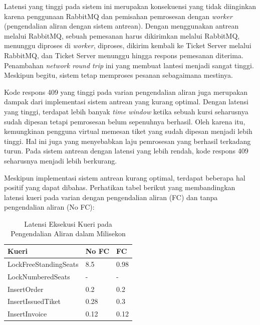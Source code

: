 Latensi yang tinggi pada sistem ini merupakan konsekuensi yang tidak diinginkan karena penggunaan RabbitMQ dan pemisahan pemrosesan dengan \textit{worker} (pengendalian aliran dengan sistem antrean). Dengan menggunakan antrean melalui RabbitMQ, sebuah pemesanan harus dikirimkan melalui RabbitMQ, menunggu diproses di \textit{worker}, diproses, dikirim kembali ke Ticket Server melalui RabbitMQ, dan Ticket Server menunggu hingga respons pemesanan diterima. Penambahan \textit{network round trip} ini yang membuat lantesi menjadi sangat tinggi. Meskipun begitu, sistem tetap memproses pesanan sebagaimana mestinya.

Kode respons 409 yang tinggi pada varian pengendalian aliran juga merupakan dampak dari implementasi sistem antrean yang kurang optimal. Dengan latensi yang tinggi, terdapat lebih banyak \textit{time window} ketika sebuah kursi seharusnya sudah dipesan tetapi pemrosesan belum sepenuhnya berhasil. Oleh karena itu, kemungkinan pengguna virtual memesan tiket yang sudah dipesan menjadi lebih tinggi. Hal ini juga yang menyebabkan laju pemrosesan yang berhasil terkadang turun. Pada sistem antrean dengan latensi yang lebih rendah, kode respons 409 seharusnya menjadi lebih berkurang.

Meskipun implementasi sistem antrean kurang optimal, terdapat beberapa hal positif yang dapat dibahas. Perhatikan tabel berikut yang membandingkan latensi kueri pada varian dengan pengendalian aliran (FC) dan tanpa pengendalian aliran (No FC):

\begin{table}[h]
    \centering
    \caption{Latensi Eksekusi Kueri pada Pengendalian Aliran dalam Milisekon}
    \label{table:latensi-kueri-fc-nofcc}
    \begin{tabular}{|l|l|l|}
        \hline
        \textbf{Kueri}        & \textbf{No FC} & \textbf{FC} \\
        \hline
        LockFreeStandingSeats & 8.5            & 0.98        \\
        \hline
        LockNumberedSeats     & -              & -           \\
        \hline
        InsertOrder           & 0.2            & 0.2         \\
        \hline
        InsertIssuedTiket     & 0.28           & 0.3         \\
        \hline
        InsertInvoice         & 0.12           & 0.12        \\
        \hline
    \end{tabular}
\end{table}

